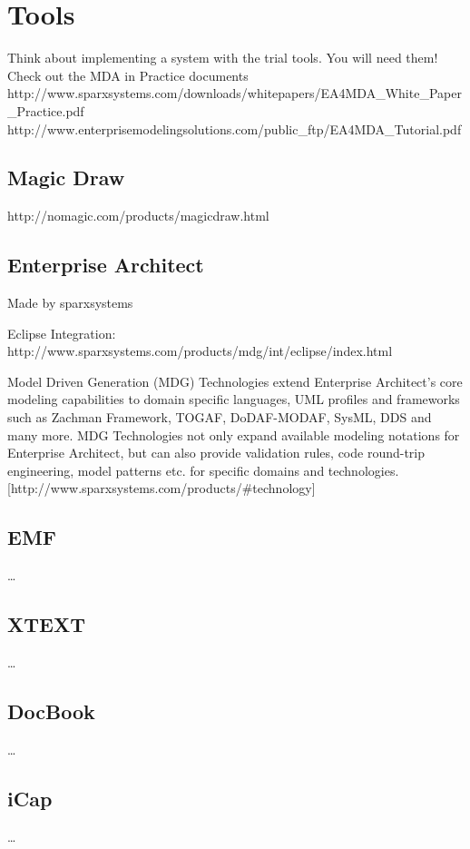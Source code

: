 
\chapter{Tools}
\label{ch:Tools}

Think about implementing a system with the trial tools. You will need
them!
Check out the MDA in Practice documents
http://www.sparxsystems.com/downloads/whitepapers/EA4MDA_White_Paper_Practice.pdf
http://www.enterprisemodelingsolutions.com/public_ftp/EA4MDA_Tutorial.pdf

\section{Magic Draw}
\label{ch:Tools:sec:Section4}

http://nomagic.com/products/magicdraw.html

\section{Enterprise Architect}
\label{ch:Tools:sec:Section1}

Made by sparxsystems

Eclipse Integration:
http://www.sparxsystems.com/products/mdg/int/eclipse/index.html

Model Driven Generation (MDG) Technologies extend Enterprise
Architect's core modeling capabilities to domain specific languages,
UML profiles and frameworks such as Zachman Framework, TOGAF,
DoDAF-MODAF, SysML, DDS and many more. MDG Technologies not only
expand available modeling notations for Enterprise Architect, but can
also provide validation rules, code round-trip engineering, model
patterns etc. for specific domains and technologies.
[http://www.sparxsystems.com/products/#technology]

\section{EMF}
\label{ch:Tools:sec:Section1}

\dots

\section{XTEXT}
\label{ch:Tools:sec:Section2}

\dots

\section{DocBook}
\label{ch:Tools:sec:Section3}

\dots

\section{iCap}
\label{ch:Tools:sec:Section4}

\dots

